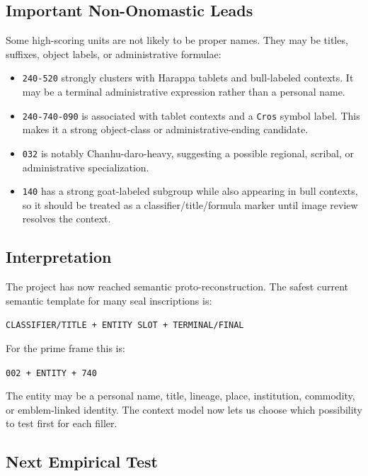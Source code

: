 \subsection{Important Non-Onomastic Leads}

Some high-scoring units are not likely to be proper names. They may be titles, suffixes, object labels, or administrative formulae:

\begin{itemize}
  \item \texttt{240-520} strongly clusters with Harappa tablets and bull-labeled contexts. It may be a terminal administrative expression rather than a personal name.
  \item \texttt{240-740-090} is associated with tablet contexts and a \texttt{Cros} symbol label. This makes it a strong object-class or administrative-ending candidate.
  \item \texttt{032} is notably Chanhu-daro-heavy, suggesting a possible regional, scribal, or administrative specialization.
  \item \texttt{140} has a strong goat-labeled subgroup while also appearing in bull contexts, so it should be treated as a classifier/title/formula marker until image review resolves the context.
\end{itemize}

\subsection{Interpretation}

The project has now reached semantic proto-reconstruction. The safest current semantic template for many seal inscriptions is:

\begin{center}
\texttt{CLASSIFIER/TITLE + ENTITY SLOT + TERMINAL/FINAL}
\end{center}

For the prime frame this is:

\begin{center}
\texttt{002 + ENTITY + 740}
\end{center}

The entity may be a personal name, title, lineage, place, institution, commodity, or emblem-linked identity. The context model now lets us choose which possibility to test first for each filler.

\subsection{Next Empirical Test}

